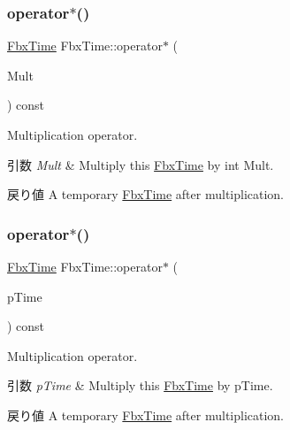 \mbox{\label{class_fbx_time_a5d1dae17adc48edd0e3149a11777ddbb}} 
\subsubsection{\texorpdfstring{operator$\ast$()}{operator*()}\hspace{0.1cm}{\footnotesize\ttfamily [1/2]}}
{\footnotesize\ttfamily \hyperlink{class_fbx_time}{Fbx\+Time} Fbx\+Time\+::operator$\ast$ (\begin{DoxyParamCaption}\item[{const int}]{Mult }\end{DoxyParamCaption}) const}

Multiplication operator. 
\begin{DoxyParams}{引数}
{\em Mult} & Multiply this \hyperlink{class_fbx_time}{Fbx\+Time} by int Mult. \\
\hline
\end{DoxyParams}
\begin{DoxyReturn}{戻り値}
A temporary \hyperlink{class_fbx_time}{Fbx\+Time} after multiplication. 
\end{DoxyReturn}
\mbox{\label{class_fbx_time_a43c5cf2a3f56dd7d2aab96b45a5473b7}} 
\subsubsection{\texorpdfstring{operator$\ast$()}{operator*()}\hspace{0.1cm}{\footnotesize\ttfamily [2/2]}}
{\footnotesize\ttfamily \hyperlink{class_fbx_time}{Fbx\+Time} Fbx\+Time\+::operator$\ast$ (\begin{DoxyParamCaption}\item[{const \hyperlink{class_fbx_time}{Fbx\+Time} \&}]{p\+Time }\end{DoxyParamCaption}) const}

Multiplication operator. 
\begin{DoxyParams}{引数}
{\em p\+Time} & Multiply this \hyperlink{class_fbx_time}{Fbx\+Time} by p\+Time. \\
\hline
\end{DoxyParams}
\begin{DoxyReturn}{戻り値}
A temporary \hyperlink{class_fbx_time}{Fbx\+Time} after multiplication. 
\end{DoxyReturn}
\mbox{\label{class_fbx_time_a42823b945fc1ccbd550df5a2b1768ca9}} 
